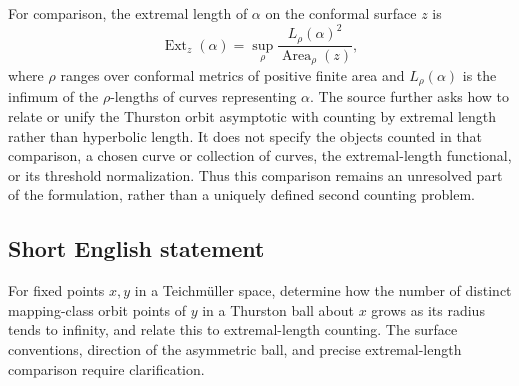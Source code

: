 \documentclass[11pt]{article}
\begin{document}
For comparison, the extremal length of \(\alpha\) on the conformal surface \(z\) is
\[
 \operatorname{Ext}_z(\alpha)
 =\sup_{\rho}
 \frac{L_\rho(\alpha)^2}{\operatorname{Area}_\rho(z)},
\]
where \(\rho\) ranges over conformal metrics of positive finite area and \(L_\rho(\alpha)\) is the infimum of the \(\rho\)-lengths of curves representing \(\alpha\). The source further asks how to relate or unify the Thurston orbit asymptotic with counting by extremal length rather than hyperbolic length. It does not specify the objects counted in that comparison, a chosen curve or collection of curves, the extremal-length functional, or its threshold normalization. Thus this comparison remains an unresolved part of the formulation, rather than a uniquely defined second counting problem.
\subsection{Short English statement}
For fixed points \(x,y\) in a Teichm\"uller space, determine how the number of distinct mapping-class orbit points of \(y\) in a Thurston ball about \(x\) grows as its radius tends to infinity, and relate this to extremal-length counting. The surface conventions, direction of the asymmetric ball, and precise extremal-length comparison require clarification.
\end{document}
